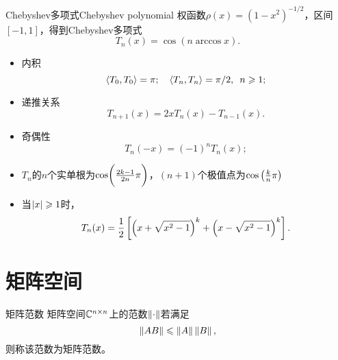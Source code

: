 \begin{example}
    {Chebyshev多项式}{Chebyshev polynomial}
    权函数$\rho(x)=(1-x^2)^{-1/2}$，区间$[-1,1]$，得到Chebyshev多项式
    \begin{equation}
        T_n(x)=\cos(n\arccos x).
    \end{equation}
    \begin{itemize}
        \item 内积 
        \begin{equation}
            \left\langle T_0,T_0\right\rangle=\pi;\quad\left\langle T_n,T_n\right\rangle=\pi/2,\enspace n\geqslant 1;
        \end{equation}
        \item 递推关系
        \begin{equation}
            T_{n+1}(x)=2xT_n(x)-T_{n-1}(x).
        \end{equation}
        \item 奇偶性
        \begin{equation}
            T_n(-x)=(-1)^nT_n(x);
        \end{equation}
        \item $T_n$的$n$个实单根为$\cos\biggl(\frac{2k-1}{2n}\pi\biggr)$，$(n+1)$个极值点为$\cos\left(\frac kn\pi\right)$
        \item 当$\left\lvert x\right\rvert\geqslant 1$时，
        \begin{equation}
            T_n(x)=\frac12\left[\left(x+\sqrt{x^2-1}\right)^k+\left(x-\sqrt{x^2-1}\right)^k\right].
        \end{equation}
    \end{itemize}
\end{example}

\section{矩阵空间}
\label{sec:matrix space}

\begin{definition}
    {矩阵范数}{}
    矩阵空间$\mathbb C^{n\times n}$上的范数$\left\lVert\cdot\right\rVert$若满足
    \begin{equation}
        \left\lVert AB\right\rVert\leqslant\left\lVert A\right\rVert\left\lVert B\right\rVert,
    \end{equation}
    则称该范数为矩阵范数。
\end{definition}

\newcommand{\Forb}[1]{\norm{#1}_{\mathrm F}}


